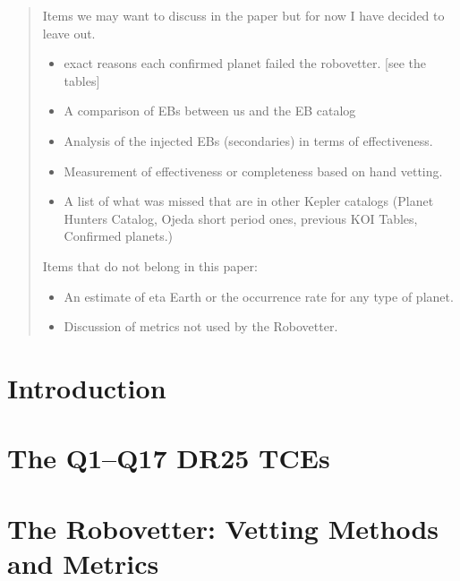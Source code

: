 \documentclass[apj,twocolappendix,numberedappendix]{emulateapj}
\renewcommand{\_}{\discretionary{\underscore}{}{\underscore}}  %
\begin{document}
\begin{abstract}
\begin{itemize}
\end{itemize}




{\color{red}

Items we may want to discuss in the paper but for now I have decided to leave out.
\begin{itemize}
\item exact reasons each confirmed planet failed the robovetter. [see the tables]
\item A comparison  of EBs between us and the EB catalog
\item Analysis of the injected EBs (secondaries) in terms of effectiveness.
\item Measurement of effectiveness or completeness based on hand vetting.
\item A list of what was missed that are in other Kepler catalogs (Planet Hunters Catalog, Ojeda short period ones, previous KOI Tables, Confirmed planets.)
\end{itemize}

Items that do not belong in this paper:
\begin{itemize}
\item An estimate of eta Earth or the occurrence rate for any type of planet.
\item Discussion of metrics not used by the Robovetter.
\end{itemize}
}

\end{abstract}


\section{Introduction}



\section{The Q1--Q17 DR25 TCEs}
\label{tcesec}





\section{The Robovetter: Vetting Methods and Metrics}

\end{document}
